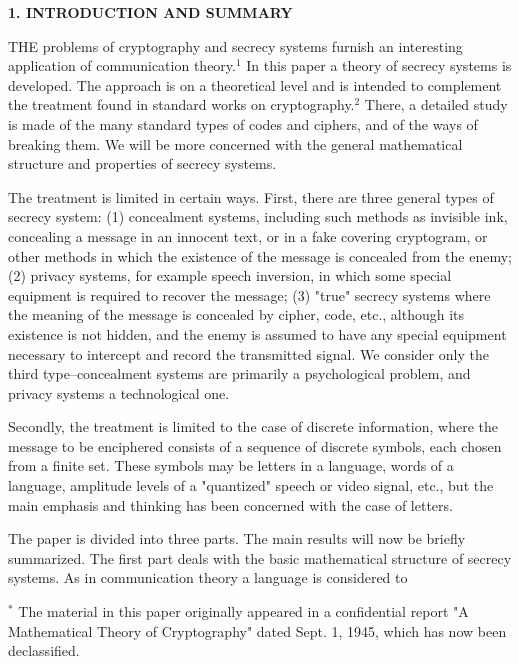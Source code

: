 \documentclass{article}
\begin{document}
\begin{itemize}
\begin{center}
\textbf{1. INTRODUCTION AND SUMMARY}
\end{center}

THE problems of cryptography and secrecy systems furnish an interesting application of communication theory.$^1$ In this paper a theory of secrecy systems is developed. The approach is on a theoretical level and is intended to complement the treatment found in standard works on cryptography.$^2$ There, a detailed study is made of the many standard types of codes and ciphers, and of the ways of breaking them. We will be more concerned with the general mathematical structure and properties of secrecy systems.

The treatment is limited in certain ways. First, there are three general types of secrecy system: (1) concealment systems, including such methods as invisible ink, concealing a message in an innocent text, or in a fake covering cryptogram, or other methods in which the existence of the message is concealed from the enemy; (2) privacy systems, for example speech inversion, in which some special equipment is required to recover the message; (3) "true" secrecy systems where the meaning of the message is concealed by cipher, code, etc., although its existence is not hidden, and the enemy is assumed to have any special equipment necessary to intercept and record the transmitted signal. We consider only the third type--concealment systems are primarily a psychological problem, and privacy systems a technological one.

Secondly, the treatment is limited to the case of discrete information, where the message to be enciphered consists of a sequence of discrete symbols, each chosen from a finite set. These symbols may be letters in a language, words of a language, amplitude levels of a "quantized" speech or video signal, etc., but the main emphasis and thinking has been concerned with the case of letters.

The paper is divided into three parts. The main results will now be briefly summarized. The first part deals with the basic mathematical structure of secrecy systems. As in communication theory a language is considered to

\vspace{10mm}

\small
$^*$ The material in this paper originally appeared in a confidential report "A Mathematical Theory of Cryptography" dated Sept. 1, 1945, which has now been declassified.


\end{itemize}
\end{document}
